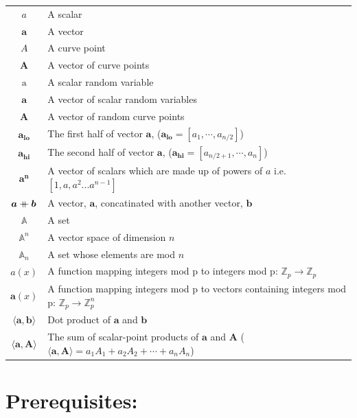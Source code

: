 \documentclass{article}
\renewcommand{\vec}[1]{\boldsymbol{#1}}
\newcommand{\ran}[1]{\mathrm{#1}}
\newcommand{\vecran}[1]{\mathbf{#1}}
\newcommand{\Z}{\mathbb{Z}}
\newcommand\concat{\mathbin{+\mkern-10mu+}} %
\newcommand{\dotp}[2]{\langle #1, #2 \rangle}
\newcommand{\opn}[1]{\operatorname{#1}}
\newcommand{\veclo}[1]{\vec{#1_{\opn{lo}}}}
\newcommand{\vechi}[1]{\vec{#1_{\opn{hi}}}}
\begin{document}
\begin{center}
\begin{tabular}{ c l }
	$a$                         & A scalar \\
	$\vec{a}$                   & A vector \\
	$A$                         & A curve point \\
	$\vec{A}$                   & A vector of curve points \\
	$\ran{a}$                   & A scalar random variable \\
	$\vecran{a}$                & A vector of scalar random variables \\
	$\vecran{A}$                & A vector of random curve points \\
	$\veclo{a}$                 & The first half of vector $\vec{a}$, ($\veclo{a} = [a_{1}, \cdots, a_{n/2}]$) \\
	$\vechi{a}$                 & The second half of vector $\vec{a}$, ($\vechi{a} = [a_{n/2+1}, \cdots, a_{n}]$) \\
	$\vec{a^n}$                 & A vector of scalars which are made up of powers of $a$ i.e. $[1,a,a^2... a^{n-1}]$\\
	$\vec{a} \concat \vec{b}$   & A vector, $\vec{a}$, concatinated with another vector, $\vec{b}$\\
	$\mathbb{A}$                & A set \\
	$\mathbb{A}^n$              & A vector space of dimension $n$ \\ 
	$\mathbb{A}_n$              & A set whose elements are mod $n$ \\ 
	$a(x)$                      & A function mapping integers mod p to integers mod p: $\Z_p \rightarrow \Z_p$ \\
	$\vec{a}(x)$                & A function mapping integers mod p to vectors containing integers mod p: $\Z_p \rightarrow \Z^n_p$ \\
	$\dotp{\vec{a}}{\vec{b}}$   & Dot product of $\vec{a}$ and $\vec{b}$ \\
	$\dotp{\vec{a}}{\vec{A}}$   & The sum of scalar-point products of $\vec{a}$ and $\vec{A}$ ($\dotp{\vec{a}}{\vec{A}} = a_1 A_1 + a_2 A_2 + \cdots + a_n A_n$) \\
\end{tabular}
\end{center}

\section{Prerequisites:}
\end{document}
